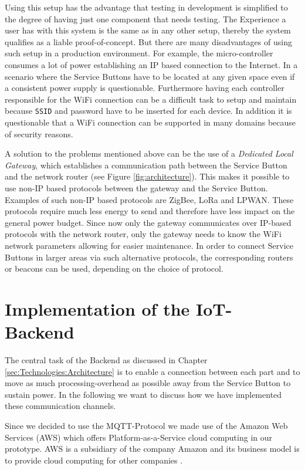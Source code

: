 Using this setup has the advantage that testing in development is simplified to the degree of having just one component that needs testing. The Experience a user has with this system is the same as in any other setup, thereby the system qualifies as a liable proof-of-concept. But there are many disadvantages of using such setup in a production environment. For example, the micro-controller consumes a lot of power establishing an IP based connection to the Internet. In a scenario where the Service Buttons have to be located at any given space even if a consistent power supply is questionable. Furthermore having each controller responsible for the WiFi connection can be a difficult task to setup and maintain because \texttt{SSID} and password have to be inserted for each device. In addition it is questionable that a WiFi connection can be supported in many domains because of security reasons.

A solution to the problems mentioned above can be the use of a \textit{Dedicated Local Gateway}, which establishes a communication path between the Service Button and the network router (see Figure \ref{fig:architecture}). This makes it possible to use non-IP based protocols between the gateway and the Service Button. Examples of such non-IP based protocols are ZigBee, LoRa and LPWAN. These protocols require much less energy to send and therefore have less impact on the general power budget. Since now only the gateway communicates over IP-based protocols with the network router, only the gateway needs to know the WiFi network parameters allowing for easier maintenance. In order to connect Service Buttons in larger areas via such alternative protocols, the corresponding routers or beacons can be used, depending on the choice of protocol. \cite{Adryan:TechFound-Components:2017}

\section{Implementation of the IoT-Backend}
\label{sec:Backend}

The central task of the Backend as discussed in Chapter \ref{sec:Technologies:Architecture} is to enable a connection between each part and to move as much processing-overhead as possible away from the Service Button to sustain power. In the following we want to discuss how we have implemented these communication channels.

Since we decided to use the MQTT-Protocol we made use of the Amazon Web Services (AWS) which offers Platform-as-a-Service cloud computing in our prototype. AWS is a subsidiary of the company Amazon and its business model is to provide cloud computing for other companies \cite{Online:Amazon:AWS}. 

